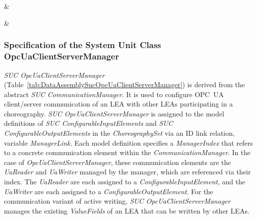 \begin{footnotesize}
\begin{longtable}
		\\ \hline
	
		\\ \hline
	
		     & 
		\\ \hline
	
		     & 
		\\ \hline
	
	\end{longtable}
\end{footnotesize}

\subsubsection{Specification of the System Unit Class OpcUaClientServerManager}

\emph{SUC OpcUaClientServerManager} (Table~\ref{tab:DataAssemblySucOpcUaClientServerManager}) is derived from the abstract \emph{SUC CommunicationManager}. It is used to configure OPC~UA client/server communication of an LEA with other LEAs participating in a choreography. \emph{SUC OpcUaClientServerManager} is assigned to the model definitions of \emph{SUC ConfigurableInputElements} and \emph{SUC ConfigurableOutputElements} in the \emph{ChoreographySet} via an ID link relation, variable \emph{ManagerLink}. Each model definition specifies a \emph{ManagerIndex} that refers to a concrete communication element within the \emph{CommunicationManager}. In the case of \emph{OpcUaClientServerManager}, these communication elements are the \emph{UaReader} and \emph{UaWriter} managed by the manager, which are referenced via their index. The \emph{UaReader} are each assigned to a \emph{ConfigurableInputElement}, and the \emph{UaWriter} are each assigned to a \emph{ConfigurableOutputElement}. For the communication variant of active writing, \emph{SUC OpcUaClientServerManager} manages the existing \emph{ValueFields} of an LEA that can be written by other LEAs. 

